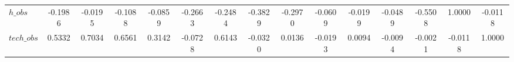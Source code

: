 \begin{center}
\begin{longtable}{lcccccccccccccc}
$h\_obs         $	 & 	          -0.1986	 & 	          -0.0195	 & 	          -0.1088	 & 	          -0.0859	 & 	          -0.2663	 & 	          -0.2484	 & 	          -0.3829	 & 	          -0.2970	 & 	          -0.0609	 & 	          -0.0199	 & 	          -0.0489	 & 	          -0.5508	 & 	           1.0000	 & 	          -0.0118 \\ 
$tech\_obs      $	 & 	           0.5332	 & 	           0.7034	 & 	           0.6561	 & 	           0.3142	 & 	          -0.0728	 & 	           0.6143	 & 	          -0.0320	 & 	           0.0136	 & 	          -0.0193	 & 	           0.0094	 & 	          -0.0094	 & 	          -0.0021	 & 	          -0.0118	 & 	           1.0000 \\ 
\end{longtable}
 \end{center}

